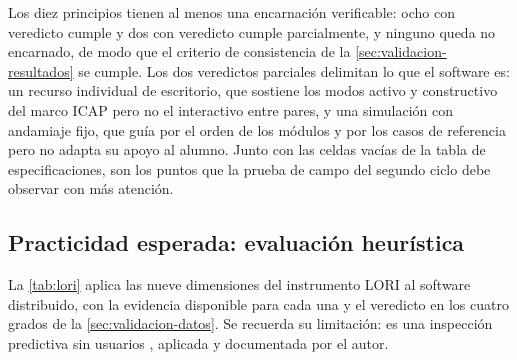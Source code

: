Los diez principios tienen al menos una encarnación verificable: ocho con veredicto cumple y dos con veredicto cumple parcialmente, y ninguno queda no encarnado, de modo que el criterio de consistencia de la \autoref{sec:validacion-resultados} se cumple. Los dos veredictos parciales delimitan lo que el software es: un recurso individual de escritorio, que sostiene los modos activo y constructivo del marco ICAP pero no el interactivo entre pares, y una simulación con andamiaje fijo, que guía por el orden de los módulos y por los casos de referencia pero no adapta su apoyo al alumno. Junto con las celdas vacías de la tabla de especificaciones, son los puntos que la prueba de campo del segundo ciclo debe observar con más atención.

\subsection{Practicidad esperada: evaluación heurística}
\label{sec:practicidad-didactica}

La \autoref{tab:lori} aplica las nueve dimensiones del instrumento LORI \autocite{leacock2007framework} al software distribuido, con la evidencia disponible para cada una y el veredicto en los cuatro grados de la \autoref{sec:validacion-datos}. Se recuerda su limitación: es una inspección predictiva sin usuarios \autocite{squires1999predicting}, aplicada y documentada por el autor.

